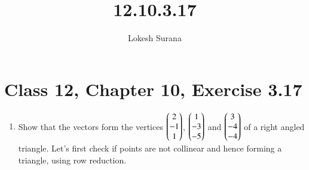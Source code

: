 \documentclass[journal,12pt,twocolumn]{IEEEtran}
\begin{document}
\vspace{3cm}
\title{12.10.3.17}
\author{Lokesh Surana}
\maketitle
\section*{Class 12, Chapter 10, Exercise 3.17}
\begin{enumerate}[start=17]
\item  Show that the vectors form the vertices $\begin{pmatrix}2\\-1\\1\end{pmatrix}$, $\begin{pmatrix}1\\-3\\-5\end{pmatrix}$ and $\begin{pmatrix}3\\-4\\-4\end{pmatrix}$ of a right angled triangle.
\break
\solution 
\fi
		Let's first check if points are not collinear and hence forming a triangle, using row reduction.


\end{enumerate}
\end{document}
